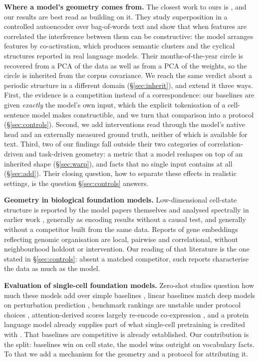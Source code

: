 \documentclass[11pt]{article}
\begin{document}
\textbf{Where a model's geometry comes from.} The closest work to ours is
\citet{prieto2026correlations}, and our results are best read as building on it. They study
superposition in a controlled autoencoder over bag-of-words text and show that when features are
correlated the interference between them can be constructive: the model arranges features by
co-activation, which produces semantic clusters and the cyclical structures reported in real language
models. Their months-of-the-year circle is recovered from a PCA of the data as well as from a PCA of
the weights, so the circle is inherited from the corpus covariance. We reach the same verdict about a
periodic structure in a different domain (\S\ref{sec:inherit}), and extend it three ways. First, the
evidence is a competition instead of a correspondence: our baselines are given \emph{exactly} the
model's own input, which the explicit tokenisation of a cell-sentence model makes constructible, and we
turn that comparison into a protocol (\S\ref{sec:controls}). Second, we add interventions read through
the model's native head and an externally measured ground truth, neither of which is available for
text. Third, two of our findings fall outside their two categories of correlation-driven and
task-driven geometry: a metric that a model reshapes on top of an inherited shape (\S\ref{sec:warp}),
and facts that no single input contains at all (\S\ref{sec:add}). Their closing question, how to
separate these effects in realistic settings, is the question \S\ref{sec:controls} answers.

\textbf{Geometry in biological foundation models.} Low-dimensional cell-state structure is reported by
the model papers themselves \citep{cui2024scgpt,theodoris2023geneformer,rosen2026uce} and analysed
spectrally in earlier work \citep{kendiukhov2026spectral}, generally as encoding results without a
causal test, and generally without a competitor built from the same data. Reports of gene embeddings
reflecting genomic organisation are local, pairwise and correlational, without neighbourhood holdout or
intervention. Our reading of that literature is the one stated in \S\ref{sec:controls}: absent a
matched competitor, such reports characterise the data as much as the model.

\textbf{Evaluation of single-cell foundation models.} Zero-shot studies question how much these models
add over simple baselines \citep{kedzierska2025zeroshot,boiarsky2023deepdive}, linear baselines match
deep models on perturbation prediction \citep{ahlmanneltze2025linear}, benchmark rankings are unstable
under protocol choices \citep{kendiukhov2026ranking}, attention-derived scores largely re-encode
co-expression \citep{kendiukhov2026attention}, and a protein language model already supplies part of
what single-cell pretraining is credited with \citep{kendiukhov2026twoaxes}. That baselines are competitive is already
established. Our contribution is the split: baselines win on cell state, the model wins outright on
vocabulary facts. To that we add a mechanism for the geometry and a protocol for attributing it.
\end{document}
